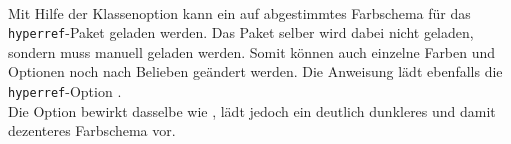 \begin{Declaration}
  \\
\end{Declaration}

Mit Hilfe der Klassenoption  kann ein auf \tubslatex abgestimmtes
Farbschema für das \texttt{hyperref}-Paket geladen werden.
Das Paket selber wird dabei nicht geladen, sondern muss manuell geladen werden.
Somit können auch einzelne Farben und Optionen noch nach Belieben geändert werden.
Die Anweisung lädt ebenfalls die \texttt{hyperref}-Option .\\
Die Option  bewirkt dasselbe wie ,
lädt jedoch ein deutlich dunkleres und damit dezenteres Farbschema vor.









